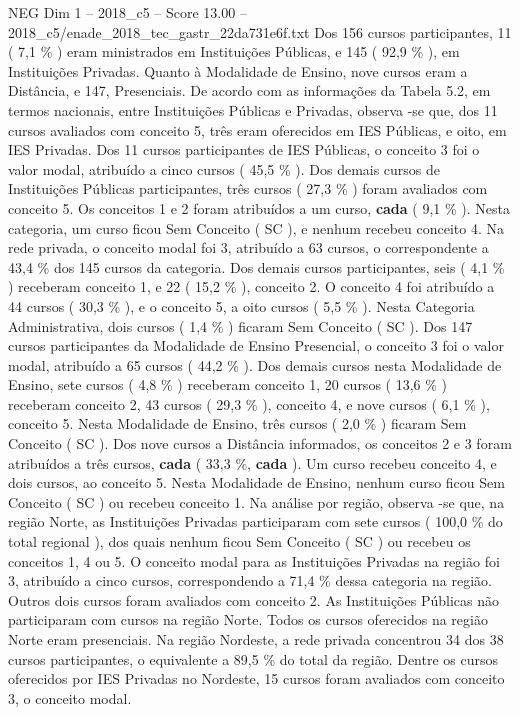\begin{textsample}{NEG Dim 1 – 2018\_c5 – Score 13.00 – 2018\_c5/enade\_2018\_tec\_gastr\_22da731e6f.txt}
Dos 156 cursos participantes, 11 ( 7,1 \% ) eram ministrados em Instituições Públicas, e 145 ( 92,9 \% ), em Instituições Privadas.
Quanto à Modalidade de Ensino, nove cursos eram a Distância, e 147, Presenciais.
De acordo com as informações da Tabela 5.2, em termos nacionais, entre Instituições Públicas e Privadas, observa -se que, dos 11 cursos avaliados com conceito 5, três eram oferecidos em IES Públicas, e oito, em IES Privadas.
Dos 11 cursos participantes de IES Públicas, o conceito 3 foi o valor modal, atribuído a cinco cursos ( 45,5 \% ).
Dos demais cursos de Instituições Públicas participantes, três cursos ( 27,3 \% ) foram avaliados com conceito 5.
Os conceitos 1 e 2 foram atribuídos a um curso, \textbf{cada} ( 9,1 \% ).
Nesta categoria, um curso ficou Sem Conceito ( SC ), e nenhum recebeu conceito 4.
Na rede privada, o conceito modal foi 3, atribuído a 63 cursos, o correspondente a 43,4 \% dos 145 cursos da categoria.
Dos demais cursos participantes, seis ( 4,1 \% ) receberam conceito 1, e 22 ( 15,2 \% ), conceito 2.
O conceito 4 foi atribuído a 44 cursos ( 30,3 \% ), e o conceito 5, a oito cursos ( 5,5 \% ).
Nesta Categoria Administrativa, dois cursos ( 1,4 \% ) ficaram Sem Conceito ( SC ).
Dos 147 cursos participantes da Modalidade de Ensino Presencial, o conceito 3 foi o valor modal, atribuído a 65 cursos ( 44,2 \% ).
Dos demais cursos nesta Modalidade de Ensino, sete cursos ( 4,8 \% ) receberam conceito 1, 20 cursos ( 13,6 \% ) receberam conceito 2, 43 cursos ( 29,3 \% ), conceito 4, e nove cursos ( 6,1 \% ), conceito 5.
Nesta Modalidade de Ensino, três cursos ( 2,0 \% ) ficaram Sem Conceito ( SC ).
Dos nove cursos a Distância informados, os conceitos 2 e 3 foram atribuídos a três cursos, \textbf{cada} ( 33,3 \%, \textbf{cada} ).
Um curso recebeu conceito 4, e dois cursos, ao conceito 5.
Nesta Modalidade de Ensino, nenhum curso ficou Sem Conceito ( SC ) ou recebeu conceito 1.
Na análise por região, observa -se que, na região Norte, as Instituições Privadas participaram com sete cursos ( 100,0 \% do total regional ), dos quais nenhum ficou Sem Conceito ( SC ) ou recebeu os conceitos 1, 4 ou 5.
O conceito modal para as Instituições Privadas na região foi 3, atribuído a cinco cursos, correspondendo a 71,4 \% dessa categoria na região.
Outros dois cursos foram avaliados com conceito 2.
As Instituições Públicas não participaram com cursos na região Norte.
Todos os cursos oferecidos na região Norte eram presenciais.
Na região Nordeste, a rede privada concentrou 34 dos 38 cursos participantes, o equivalente a 89,5 \% do total da região.
Dentre os cursos oferecidos por IES Privadas no Nordeste, 15 cursos foram avaliados com conceito 3, o conceito modal.

\end{textsample}
